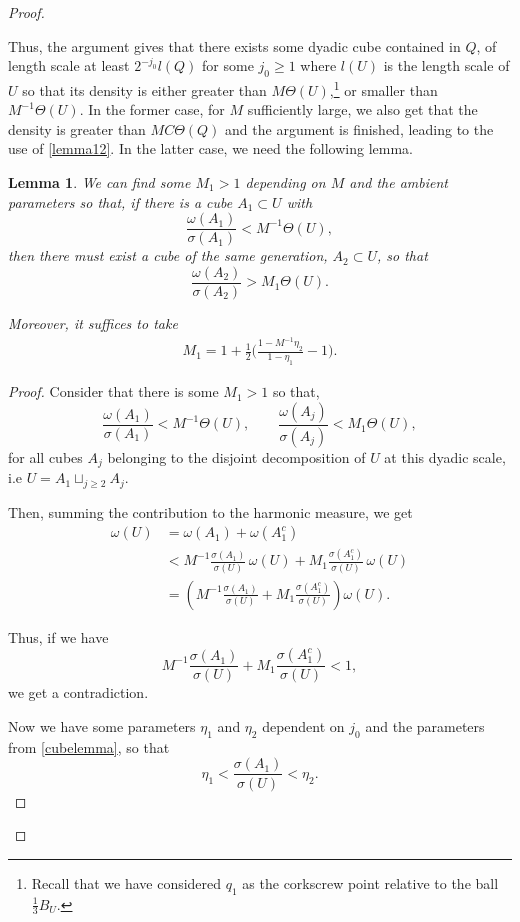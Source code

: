 \documentclass{article}
\newcounter{lem}
\theoremstyle{plain}
\theoremstyle{plain}
\newcommand{\thee}{\Theta(U)}
\newtheorem{lemma}[theorem]{Lemma}
\theoremstyle{definition}
\theoremstyle{plain}
\begin{document}
\begin{proof}
\begin{itemize}
Thus, the argument gives that there exists some dyadic cube contained in $Q$, of length scale at least $2^{-j_0}l(Q)$ for some $j_0 \geq 1$ where $l(U)$ is the length scale of $U$ so that its density is either greater than $M\Theta(U)$,\footnote{Recall that we have considered $q_1$ as the corkscrew point relative to the ball $\tfrac13 B_U$.} or smaller than $M^{-1}\Theta(U)$. In the former case, for $M$ sufficiently large, we also get that the density is greater than $MC\Theta(Q)$ and the argument is finished, leading to the use of \cref{lemma12}. In the latter case, we need the following lemma.

 
\begin{lemma}\label{lemma11} We can find some $M_1>1$ depending on $M$ and the ambient parameters
so that, if there is a cube $A_1\subset U$ with
\[
\frac{\omega(A_1)}{\sigma(A_1)} < M^{-1}\Theta(U),
\]
then there must exist a cube of the same generation, $A_2\subset U$, so that
\[
\frac{\omega(A_2)}{\sigma(A_2)} > M_1\Theta(U).
\]

Moreover, it suffices to take 
\begin{align*}
    M_1 =1+\frac{1}{2}\Big( \frac{1- M^{-1}\eta_2}{1-\eta_1} -1 \Big).
\end{align*}
\end{lemma}
\begin{proof}Consider that there is some $M_1 > 1$ so that,
\[
\frac{\omega(A_1)}{\sigma(A_1)} < M^{-1}\thee, 
\qquad
\frac{\omega(A_j)}{\sigma(A_j)} < M_1\thee,
\]
for all cubes $A_j$ belonging to the disjoint decomposition of $U$ at this dyadic scale, i.e $U= A_1\sqcup_{j\geq 2} A_j$.

Then, summing the contribution to the harmonic measure, we get
\begin{align*}
\omega(U)
&= \omega(A_1) + \omega(A_1^c) \\
&< M^{-1}\frac{\sigma(A_1)}{\sigma(U)} \, \omega(U)
  + M_1 \frac{\sigma(A_1^c)}{\sigma(U)} \, \omega(U) \\
&= \left(
    M^{-1}\frac{\sigma(A_1)}{\sigma(U)}
    + M_1\frac{\sigma(A_1^c)}{\sigma(U)}
  \right)\omega(U).
\end{align*}

Thus, if we have
\[
M^{-1}\frac{\sigma(A_1)}{\sigma(U)}
+ M_1\frac{\sigma(A_1^c)}{\sigma(U)}
< 1,
\]
we get a contradiction.

Now we have some parameters $\eta_1$ and $\eta_2$ dependent on $j_0$ and the parameters from \cref{cubelemma}, so that
\[
\eta_1 < \frac{\sigma(A_1)}{\sigma(U)} < \eta_2.
\]


\end{proof}
\end{itemize}
\end{proof}
\end{document}
